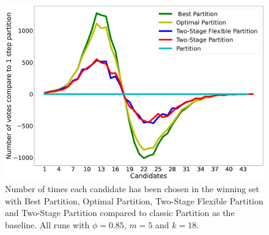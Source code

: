 \documentclass[letterpaper]{article} %
\begin{document}
\begin{figure}
 \centering
 \includegraphics[width=\columnwidth]{./images/candidates_results_18_winners_phi_0_85_last_new_new_new_new.png}
 \caption{Number of times each candidate has been chosen in the winning set with Best Partition, Optimal Partition, Two-Stage Flexible Partition and Two-Stage Partition compared to classic Partition as the baseline. All runs with $\phi = 0.85$, $m = 5$ and $k = 18$.}
 \label{fig:candidates-performances}
\end{figure}
\end{document}
